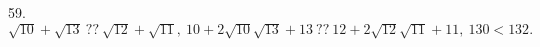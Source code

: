 59. $\sqrt{10}+\sqrt{13}\ ??\ \sqrt{12}+\sqrt{11},\ 10+2\sqrt{10}\sqrt{13}+13\ ??\ 12+2\sqrt{12}\sqrt{11}+11,\ 130<132.$\\
